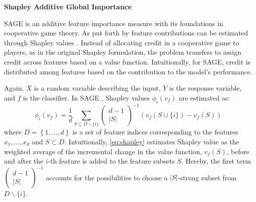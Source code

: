 \textbf{Shapley Additive Global Importance}

\gls{SAGE} is an additive feature importance measure with its foundations in cooperative game theory. As put forth by \textcite[\checkmark][4770]{lundbergUnifiedApproachInterpreting2017} feature contributions can be estimated through Shapley values \autocite[\checkmark][310--312]{shapley17ValueNPerson1953}. Instead of allocating credit in a cooperative game to players, as in the original Shapley formulation, the problem transfers to assign credit across features based on a value function. Intuitionally, for \gls{SAGE}, credit is distributed among features based on the contribution to the model's performance.

Again, $X$ is a random variable describing the input, $Y$ is the response variable, and $f$ is the classifier. In \gls{SAGE} \autocite[\checkmark][17215--17216]{covertUnderstandingGlobalFeature2020}, Shapley values $\phi_i(v_f)$ are estimated as:
\begin{equation}
    \phi_i(v_f)=\frac{1}{d} \sum_{S \subseteq D \backslash\{i\}}\left(\begin{array}{c}
        d-1 \\
        |S|
        \end{array}\right)^{-1}(v_f(S \cup\{i\})-v_f(S))
        \label{eq:shapley}
\end{equation}
where $D=\left\{1,\ldots,d\right\}$ is a set of feature indices corresponding to the features $x_1,\ldots,x_d$ and $S\subset D$. Intuitionally, \cref{eq:shapley} estimates Shapley value as the weighted average of the incremental change in the value function, $v_f(S)$, before and after the $i$-th feature is added to the feature subsets $S$. Hereby, the first term $\left(\begin{smallmatrix} d-1 \\|S|\end{smallmatrix}\right)^{-1}$ accounts for the possibilities to choose a $|S|$-strong subset from $D \backslash\{i\}$. 

